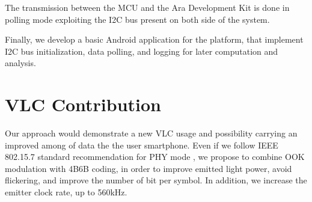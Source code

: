 The transmission between the MCU and the Ara Development Kit is done in polling mode exploiting the I2C bus present on both side of the system. 

Finally, we develop a basic Android application for the platform, that implement I2C bus initialization, data polling, and logging for later computation and analysis.



\section{VLC Contribution}


Our approach would demonstrate a new VLC usage and possibility carrying an improved among of data the the user smartphone. Even if we follow IEEE 802.15.7 standard recommendation for PHY mode , we propose to combine OOK modulation with 4B6B coding, in order to improve emitted light power, avoid flickering, and improve the number of bit per symbol. In addition, we increase the emitter clock rate, up to 560kHz.
